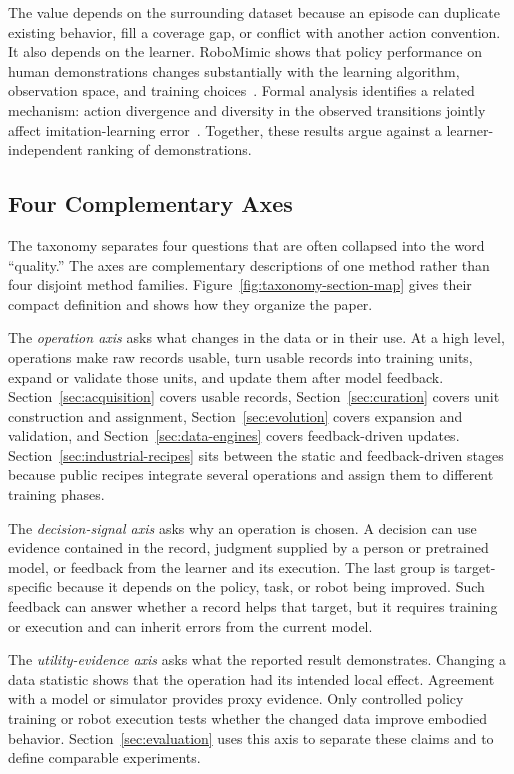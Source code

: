 The value depends on the surrounding dataset because an episode can duplicate existing behavior, fill a coverage gap, or conflict with another action convention.
It also depends on the learner.
RoboMimic shows that policy performance on human demonstrations changes substantially with the learning algorithm, observation space, and training choices~\cite{mandlekar2021what_2108_03298}.
Formal analysis identifies a related mechanism: action divergence and diversity in the observed transitions jointly affect imitation-learning error~\cite{belkhale2023data_2306_02437}.
Together, these results argue against a learner-independent ranking of demonstrations.

\subsection{Four Complementary Axes}

The taxonomy separates four questions that are often collapsed into the word ``quality.''
The axes are complementary descriptions of one method rather than four disjoint method families.
Figure~\ref{fig:taxonomy-section-map} gives their compact definition and shows how they organize the paper.



The \emph{operation axis} asks what changes in the data or in their use.
At a high level, operations make raw records usable, turn usable records into training units, expand or validate those units, and update them after model feedback.
Section~\ref{sec:acquisition} covers usable records, Section~\ref{sec:curation} covers unit construction and assignment, Section~\ref{sec:evolution} covers expansion and validation, and Section~\ref{sec:data-engines} covers feedback-driven updates.
Section~\ref{sec:industrial-recipes} sits between the static and feedback-driven stages because public recipes integrate several operations and assign them to different training phases.

The \emph{decision-signal axis} asks why an operation is chosen.
A decision can use evidence contained in the record, judgment supplied by a person or pretrained model, or feedback from the learner and its execution.
The last group is target-specific because it depends on the policy, task, or robot being improved.
Such feedback can answer whether a record helps that target, but it requires training or execution and can inherit errors from the current model.

The \emph{utility-evidence axis} asks what the reported result demonstrates.
Changing a data statistic shows that the operation had its intended local effect.
Agreement with a model or simulator provides proxy evidence.
Only controlled policy training or robot execution tests whether the changed data improve embodied behavior.
Section~\ref{sec:evaluation} uses this axis to separate these claims and to define comparable experiments.


